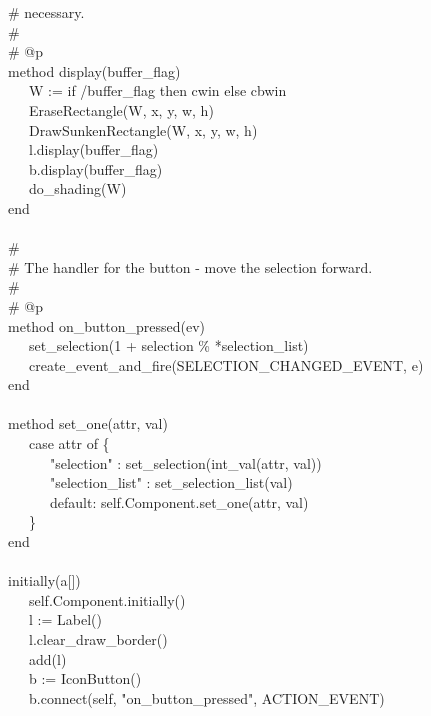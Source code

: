{\>   \# necessary. \\
\>   \# \\
\>   \# @p \\
\>   method display(buffer\_flag) \\
\>   \ \ \ W := if /buffer\_flag then cwin else cbwin \\
\>   \ \ \ EraseRectangle(W, x, y, w, h) \\
\>   \ \ \ DrawSunkenRectangle(W, x, y, w, h) \\
\>   \ \ \ l.display(buffer\_flag) \\
\>   \ \ \ b.display(buffer\_flag) \\
\>   \ \ \ do\_shading(W) \\
\>   end \\
\ \\
\>   \# \\
\>   \# The handler for the button - move the selection forward. \\
\>   \# \\
\>   \# @p \\
\>   method on\_button\_pressed(ev) \\
\>   \ \ \ set\_selection(1 + selection \%
*selection\_list) \\
\>   \ \ \ create\_event\_and\_fire(SELECTION\_CHANGED\_EVENT, e) \\
\>   end \\
\ \\
\>   method set\_one(attr, val) \\
\>   \ \ \ case attr of \{ \\
\>   \ \ \ \ \ \ "selection" :
set\_selection(int\_val(attr, val)) \\
\>   \ \ \ \ \ \ "selection\_list" :
set\_selection\_list(val) \\
\>   \ \ \ \ \ \ default: self.Component.set\_one(attr, val) \\
\>   \ \ \ \} \\
\>   end \\
\ \\
\>   initially(a[])  \\
\>   \ \ \ self.Component.initially() \\
\>   \ \ \ l := Label() \\
\>   \ \ \ l.clear\_draw\_border() \\
\>   \ \ \ add(l) \\
\>   \ \ \ b := IconButton() \\
\>   \ \ \ b.connect(self,
"on\_button\_pressed", ACTION\_EVENT) \\
}
